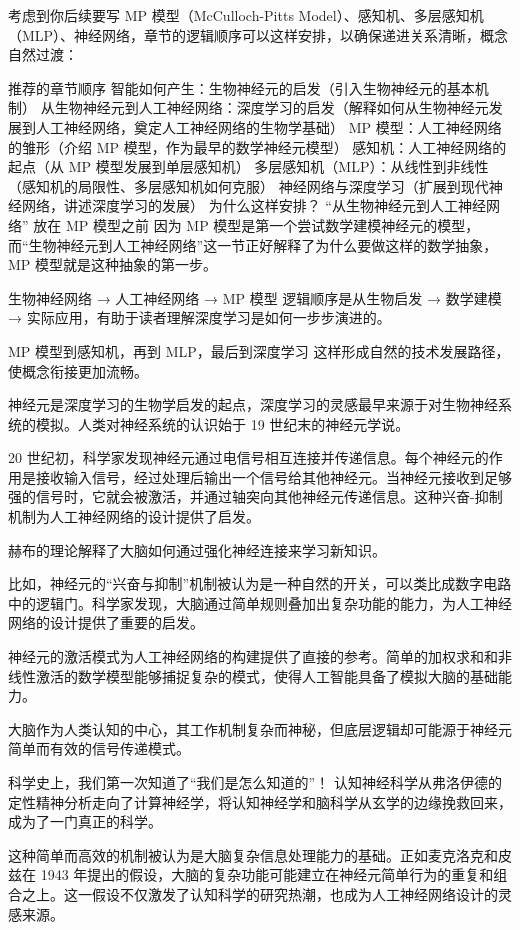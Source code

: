 考虑到你后续要写 MP 模型（McCulloch-Pitts Model）、感知机、多层感知机（MLP）、神经网络，章节的逻辑顺序可以这样安排，以确保递进关系清晰，概念自然过渡：

推荐的章节顺序
智能如何产生：生物神经元的启发（引入生物神经元的基本机制）
从生物神经元到人工神经网络：深度学习的启发（解释如何从生物神经元发展到人工神经网络，奠定人工神经网络的生物学基础）
MP 模型：人工神经网络的雏形（介绍 MP 模型，作为最早的数学神经元模型）
感知机：人工神经网络的起点（从 MP 模型发展到单层感知机）
多层感知机（MLP）：从线性到非线性（感知机的局限性、多层感知机如何克服）
神经网络与深度学习（扩展到现代神经网络，讲述深度学习的发展）
为什么这样安排？
“从生物神经元到人工神经网络” 放在 MP 模型之前
因为 MP 模型是第一个尝试数学建模神经元的模型，而“生物神经元到人工神经网络”这一节正好解释了为什么要做这样的数学抽象，MP 模型就是这种抽象的第一步。

生物神经网络 → 人工神经网络 → MP 模型
逻辑顺序是从生物启发 → 数学建模 → 实际应用，有助于读者理解深度学习是如何一步步演进的。

MP 模型到感知机，再到 MLP，最后到深度学习
这样形成自然的技术发展路径，使概念衔接更加流畅。


神经元是深度学习的生物学启发的起点，深度学习的灵感最早来源于对生物神经系统的模拟。人类对神经系统的认识始于 19 世纪末的神经元学说。

20 世纪初，科学家发现神经元通过电信号相互连接并传递信息。每个神经元的作用是接收输入信号，经过处理后输出一个信号给其他神经元。当神经元接收到足够强的信号时，它就会被激活，并通过轴突向其他神经元传递信息。这种兴奋-抑制机制为人工神经网络的设计提供了启发。


赫布的理论解释了大脑如何通过强化神经连接来学习新知识。

比如，神经元的“兴奋与抑制”机制被认为是一种自然的开关，可以类比成数字电路中的逻辑门。科学家发现，大脑通过简单规则叠加出复杂功能的能力，为人工神经网络的设计提供了重要的启发。

神经元的激活模式为人工神经网络的构建提供了直接的参考。简单的加权求和和非线性激活的数学模型能够捕捉复杂的模式，使得人工智能具备了模拟大脑的基础能力。


大脑作为人类认知的中心，其工作机制复杂而神秘，但底层逻辑却可能源于神经元简单而有效的信号传递模式。

科学史上，我们第一次知道了“我们是怎么知道的”！
认知神经科学从弗洛伊德的定性精神分析走向了计算神经学，将认知神经学和脑科学从玄学的边缘挽救回来，成为了一门真正的科学。



这种简单而高效的机制被认为是大脑复杂信息处理能力的基础。正如麦克洛克和皮兹在 1943 年提出的假设，大脑的复杂功能可能建立在神经元简单行为的重复和组合之上。这一假设不仅激发了认知科学的研究热潮，也成为人工神经网络设计的灵感来源。


